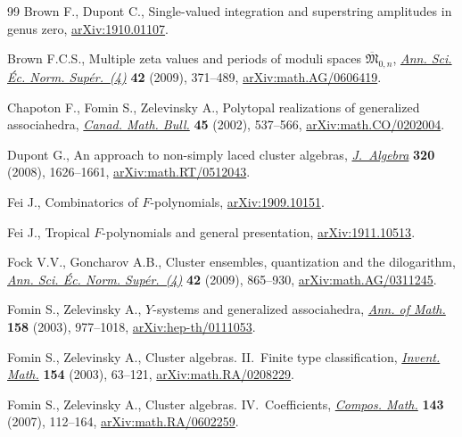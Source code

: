 \documentclass[pdftex]{sigma}%
\numberwithin{equation}{section}
\begin{document}
\begin{thebibliography}{99}
Brown F., Dupont C., Single-valued integration and superstring amplitudes in
 genus zero, \href{https://arxiv.org/abs/1910.01107}{arXiv:1910.01107}.

Brown F.C.S., Multiple zeta values and periods of moduli spaces
 {$\overline{\mathfrak M}_{0,n}$}, \href{https://doi.org/10.24033/asens.2099}{\textit{Ann. Sci. \'Ec. Norm. Sup\'er.~(4)}}
 \textbf{42} (2009), 371--489, \href{https://arxiv.org/abs/math.AG/0606419}{arXiv:math.AG/0606419}.

Chapoton F., Fomin S., Zelevinsky A., Polytopal realizations of generalized
 associahedra, \href{https://doi.org/10.4153/CMB-2002-054-1}{\textit{Canad. Math. Bull.}} \textbf{45} (2002), 537--566, \href{https://arxiv.org/abs/math.CO/0202004}{arXiv:math.CO/0202004}.

Dupont G., An approach to non-simply laced cluster algebras,
 \href{https://doi.org/10.1016/j.jalgebra.2008.03.018}{\textit{J.~Algebra}} \textbf{320} (2008), 1626--1661,
 \href{https://arxiv.org/abs/math.RT/0512043}{arXiv:math.RT/0512043}.

Fei J., Combinatorics of {$F$}-polynomials, \href{https://arxiv.org/abs/1909.10151}{arXiv:1909.10151}.

Fei J., Tropical {$F$}-polynomials and general presentation,
 \href{https://arxiv.org/abs/1911.10513}{arXiv:1911.10513}.

Fock V.V., Goncharov A.B., Cluster ensembles, quantization and the dilogarithm,
 \href{https://doi.org/10.24033/asens.2112}{\textit{Ann. Sci. \'Ec. Norm. Sup\'er.~(4)}} \textbf{42} (2009), 865--930,
 \href{https://arxiv.org/abs/math.AG/0311245}{arXiv:math.AG/0311245}.

Fomin S., Zelevinsky A., {$Y$}-systems and generalized associahedra,
 \href{https://doi.org/10.4007/annals.2003.158.977}{\textit{Ann. of Math.}} \textbf{158} (2003), 977--1018,
 \href{https://arxiv.org/abs/hep-th/0111053}{arXiv:hep-th/0111053}.

Fomin S., Zelevinsky A., Cluster algebras. {II}.~{F}inite type classification,
 \href{https://doi.org/10.1007/s00222-003-0302-y}{\textit{Invent. Math.}} \textbf{154} (2003), 63--121,
 \href{https://arxiv.org/abs/math.RA/0208229}{arXiv:math.RA/0208229}.

Fomin S., Zelevinsky A., Cluster algebras. {IV}.~{C}oefficients,
 \href{https://doi.org/10.1112/S0010437X06002521}{\textit{Compos. Math.}} \textbf{143} (2007), 112--164,
 \href{https://arxiv.org/abs/math.RA/0602259}{arXiv:math.RA/0602259}.


\end{thebibliography}
\end{document}
